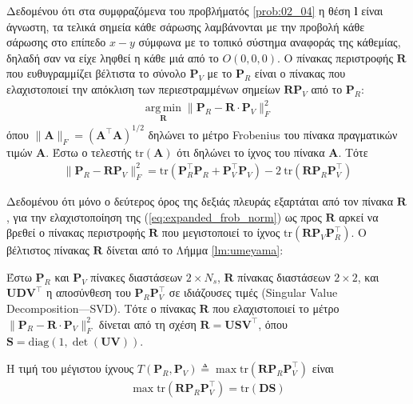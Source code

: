 Δεδομένου ότι στα συμφραζόμενα του προβλήματός \ref{prob:02_04} η θέση $\bm{l}$
είναι άγνωστη, τα τελικά σημεία κάθε σάρωσης λαμβάνονται με την προβολή κάθε
σάρωσης στο επίπεδο $x-y$ σύμφωνα με το τοπικό σύστημα αναφοράς της κάθεμίας,
δηλαδή σαν να είχε ληφθεί η κάθε μιά από το $O(0,0,0)$. Ο πίνακας περιστροφής
$\bm{R}$ που ευθυγραμμίζει βέλτιστα το σύνολο $\bm{P}_V$ με το $\bm{P}_R$ είναι
ο πίνακας που ελαχιστοποιεί την απόκλιση των περιεστραμμένων σημείων
$\bm{R}\bm{P}_V$ από το $\bm{P}_R$:
\begin{align}
  \operatorname*{arg\,min}\limits_{\bm{R}} \|\bm{P}_R - \bm{R} \cdot \bm{P}_V\|_F^2 \nonumber
\end{align}
όπου $\|\bm{A}\|_F = (\bm{A}^\top\bm{A})^{1/2}$ δηλώνει το μέτρο Frobenius του
πίνακα πραγματικών τιμών $\bm{A}$. Έστω ο τελεστής $\text{tr}(\bm{A})$ ότι
δηλώνει το ίχνος του πίνακα $\bm{A}$. Τότε
\begin{align}
  \|\bm{P}_R - \bm{R} \bm{P}_V\|_F^2 = \text{tr}(\bm{P}_R^\top \bm{P}_R + \bm{P}_V^\top \bm{P}_V) - 2 \ \text{tr}(\bm{R} \bm{P}_R \bm{P}_V^\top)
  \label{eq:expanded_frob_norm}
\end{align}

Δεδομένου ότι μόνο ο δεύτερος όρος της δεξιάς πλευράς εξαρτάται από τον πίνακα
$\bm{R}$, για την ελαχιστοποίηση της (\ref{eq:expanded_frob_norm}) ως προς
$\bm{R}$ αρκεί να βρεθεί ο πίνακας περιστροφής $\bm{R}$ που μεγιστοποιεί
το ίχνος $\text{tr}(\bm{R} \bm{P}_V \bm{P}_R^\top)$. Ο βέλτιστος πίνακας
$\bm{R}$ δίνεται από το Λήμμα \ref{lm:umeyama}:

\begin{lemma}
  \label{lm:umeyama}
  Έστω $\bm{P}_R$ και $\bm{P}_V$ πίνακες διαστάσεων $2 \times N_s$, $\bm{R}$
  πίνακας διαστάσεων $2 \times 2$, και $\bm{U} \bm{D} \bm{V}^\top$ η αποσύνθεση
  του $\bm{P}_R \bm{P}_V^\top$ σε ιδιάζουσες τιμές (Singular Value
  Decomposition---SVD). Τότε ο πίνακας $\bm{R}$ που ελαχιστοποιεί το μέτρο
  $\|\bm{P}_R - \bm{R} \cdot \bm{P}_V\|_F^2$ δίνεται από τη σχέση
  $\bm{R} = \bm{U} \bm{S} \bm{V}^\top$, όπου
  $\bm{S} = \text{diag}(1,\det{(\bm{U}\bm{V})})$.
\end{lemma}

\begin{corollary}
  \label{corollary:umeyama}
  Η τιμή του μέγιστου ίχνους
  $T(\bm{P}_R, \bm{P}_V) \triangleq \max\text{tr}(\bm{R} \bm{P}_R \bm{P}_V^\top)$
  είναι
  \begin{align}
  \max\text{tr}(\bm{R} \bm{P}_R \bm{P}_V^\top) = \text{tr}(\bm{D}\bm{S})
  \end{align}
\end{corollary}

